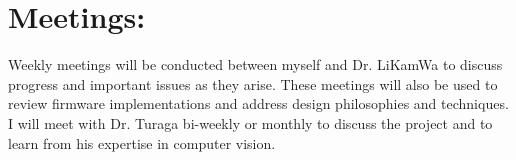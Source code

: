 \section{Meetings:}
\indent Weekly meetings will be conducted between myself and Dr. LiKamWa to discuss progress and important issues as they arise.
These meetings will also be used to review firmware implementations and address design philosophies and techniques. I will meet
with Dr. Turaga bi-weekly or monthly to discuss the project and to learn from his expertise in computer vision.